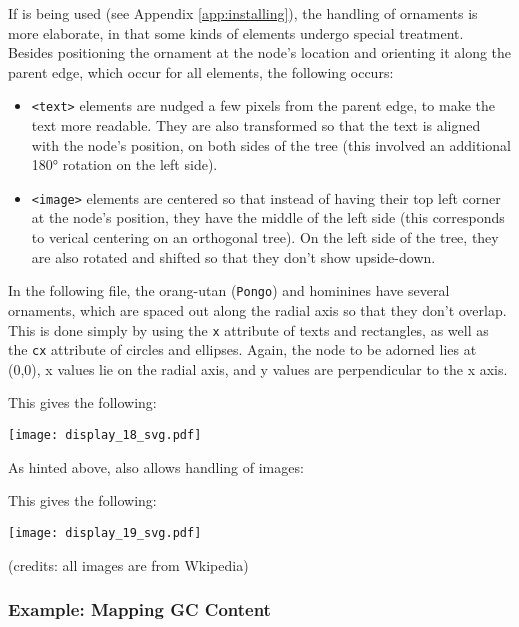 If \libxml{} is being used (see Appendix \ref{app:installing}), the handling of ornaments is more elaborate, in that some kinds of elements undergo special treatment. Besides positioning the ornament at the node's location and orienting it along the parent edge, which occur for all elements, the following occurs:
\begin{itemize}
	\item \texttt{<text>} elements are nudged a few pixels from the parent edge,
	to make the text more readable. They are also transformed so that the text is
	aligned with the node's position, on both sides of the tree (this involved an
	additional 180° rotation on the left side).
	\item \texttt{<image>} elements are centered so that instead of having their
	top left corner at the node's position, they have the middle of the left side
	(this corresponds to verical centering on an orthogonal tree). On the left
	side of the tree, they are also rotated and shifted so that they don't show
	upside-down.
\end{itemize}

In the following file, the orang-utan (\texttt{Pongo}) and hominines have
several ornaments, which are spaced out along the radial axis so that they don't
overlap. This is done simply by using the \texttt{x} attribute of texts and
rectangles, as well as the \texttt{cx} attribute of circles and ellipses. Again,
the node to be adorned lies at (0,0), x values lie on the radial axis, and y
values are perpendicular to the x axis.



This gives the following:


\begin{center}
\texttt{[image: display\_18\_svg.pdf]}
\end{center}

As hinted above, \libxml{} also allows handling of images:



This gives the following:


\begin{center}
\texttt{[image: display\_19\_svg.pdf]}
\end{center}
(credits: all images are from Wkipedia)

\subsubsection{Example: Mapping GC Content}
\label{sct_display_ornament_xpl_gc}

